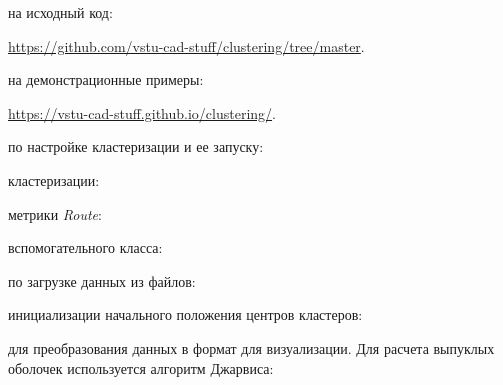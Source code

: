 \addtocounter{page}{10}


 на исходный код:
\begin{center}
    \url{https://github.com/vstu-cad-stuff/clustering/tree/master}.
\end{center}

 на демонстрационные примеры:
\begin{center}
    \url{https://vstu-cad-stuff.github.io/clustering/}.
\end{center}

 по настройке кластеризации и ее запуску:


 кластеризации:


 метрики \emph{Route}:


 вспомогательного класса:


 по загрузке данных из файлов:


 инициализации начального положения центров кластеров:


\pagebreak
{} для преобразования данных в формат для визуализации. Для расчета выпуклых оболочек используется алгоритм Джарвиса:

